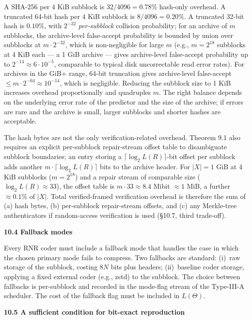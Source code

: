 \documentclass[
]{article}
\begin{document}
A SHA-256 per 4 KiB subblock is $32/4096 = 0.78\%$ hash-only overhead.
A truncated 64-bit hash per 4 KiB subblock is $8/4096 = 0.20\%$. A
truncated 32-bit hash is $0.10\%$, with $2^{-32}$ \emph{per-subblock}
collision probability; for an archive of $m$ subblocks, the
archive-level false-accept probability is bounded by union over
subblocks at $m \cdot 2^{-32}$, which is non-negligible for large
$m$ (e.g., $m = 2^{18}$ subblocks at 4 KiB each --- a 1 GiB archive
--- gives archive-level false-accept probability up to $2^{-14}
\approx 6 \cdot 10^{-5}$, comparable to typical disk uncorrectable
read error rates). For archives in the GiB+ range, 64-bit
truncation gives archive-level false-accept $\leq m \cdot 2^{-64}
\approx 10^{-14}$, which is negligible. Reducing the subblock size
to 1 KiB increases overhead proportionally and quadruples $m$. The
right balance depends on the underlying error rate of the
predictor and the size of the archive; if errors are rare and the
archive is small, larger subblocks and shorter hashes are
acceptable.

The hash bytes are not the only verification-related overhead.
Theorem 9.1 also requires an explicit per-subblock repair-stream
offset table to disambiguate subblock boundaries; an entry storing
a $\lceil \log_2 L(R) \rceil$-bit offset per subblock adds another
$m \cdot \lceil \log_2 L(R) \rceil$ bits to the archive header. For
$|X| = 1$ GiB at 4 KiB subblocks ($m = 2^{18}$) and a repair
stream of comparable size ($\log_2 L(R) \approx 33$), the offset
table is $m \cdot 33 \approx 8.4$ Mibit $\approx 1$ MiB, a further
$\approx 0.1\%$ of $|X|$. Total verified-framed verification
overhead is therefore the sum of (a) hash bytes, (b) per-subblock
repair-stream offsets, and (c) any Merkle-tree authenticators if
random-access verification is used (§10.7, third trade-off).

\textbf{10.4 Fallback modes}

Every RNR coder must include a fallback mode that handles the case in
which the chosen primary mode fails to compress. Two fallbacks are
standard: (i)~raw storage of the subblock, costing $8N$ bits plus
headers; (ii)~baseline coder storage, applying a fixed external coder
(e.g., zstd) to the subblock. The choice between fallbacks is
per-subblock and recorded in the mode-flag stream of the Type-III-A
scheduler. The cost of the fallback flag must be included in
$L(\Theta)$.

\textbf{10.5 A sufficient condition for bit-exact reproduction}
\end{document}
